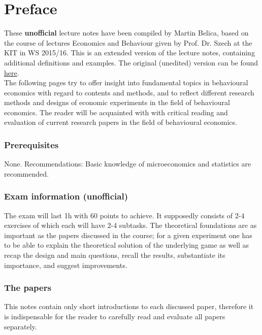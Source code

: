 

\chapter*{Preface}

These \textbf{unofficial} lecture notes have been compiled by Martin Belica, based on the course of lectures Economics and Behaviour given by Prof. Dr. Szech at the KIT in WS 2015/16. This is an extended version of the lecture notes, containing additional definitions and examples. The original (unedited) version can be found \href{http://goo.gl/EOC2Kh}{here}. \\

The following pages try to offer insight into fundamental topics in behavioural economics with regard to contents and methods, and to reflect different research methods and designs of economic experiments in the field of behavioural economics. The reader will be acquainted with with critical reading and evaluation of current research papers in the field of behavioural economics. \\

\subsection*{Prerequisites}
None. Recommendations: Basic knowledge of microeconomics and statistics are recommended. \\

\subsection*{Exam information  (unofficial)} 
The exam will last 1h with 60 points to achieve. It supposedly consists of 2-4 exercises of which each will have 2-4 subtasks. The theoretical foundations are as important as the papers discussed in the course; for a given experiment one has to be able to explain the theoretical solution of the underlying game as well as recap the design and main questions, recall the results, substantiate its importance, and suggest improvements. \\

\subsection*{The papers} 
This notes contain only short introductions to each discussed paper, therefore it is indispensable for the reader to carefully read and evaluate all papers separately.